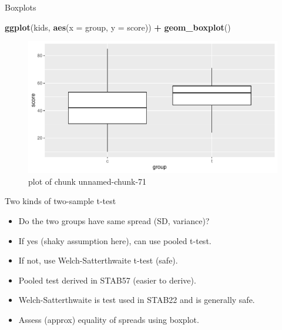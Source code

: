 \documentclass[ignorenonframetext,]{beamer}
\newenvironment{Shaded}{\begin{snugshade}}{\end{snugshade}}
\newcommand{\DataTypeTok}[1]{\textcolor[rgb]{0.13,0.29,0.53}{#1}}
\newcommand{\KeywordTok}[1]{\textcolor[rgb]{0.13,0.29,0.53}{\textbf{#1}}}
\newcommand{\NormalTok}[1]{#1}
\newcommand{\OperatorTok}[1]{\textcolor[rgb]{0.81,0.36,0.00}{\textbf{#1}}}
\newcommand{\StringTok}[1]{\textcolor[rgb]{0.31,0.60,0.02}{#1}}
\providecommand{\tightlist}{%
  \setlength{\itemsep}{0pt}\setlength{\parskip}{0pt}}
\begin{document}
\begin{frame}[fragile]{Boxplots}
\protect\hypertarget{boxplots}{}

\begin{Shaded}
\begin{Highlighting}[]
\KeywordTok{ggplot}\NormalTok{(kids, }\KeywordTok{aes}\NormalTok{(}\DataTypeTok{x =}\NormalTok{ group, }\DataTypeTok{y =}\NormalTok{ score)) }\OperatorTok{+}\StringTok{ }\KeywordTok{geom_boxplot}\NormalTok{()}
\end{Highlighting}
\end{Shaded}

\begin{figure}
\centering
\includegraphics{figure/unnamed-chunk-71-1.pdf}
\caption{plot of chunk unnamed-chunk-71}
\end{figure}

\end{frame}

\begin{frame}{Two kinds of two-sample t-test}
\protect\hypertarget{two-kinds-of-two-sample-t-test}{}

\begin{itemize}
\tightlist
\item
  Do the two groups have same spread (SD, variance)?
\item
  If yes (shaky assumption here), can use pooled t-test.
\item
  If not, use Welch-Satterthwaite t-test (safe).
\item
  Pooled test derived in STAB57 (easier to derive).
\item
  Welch-Satterthwaite is test used in STAB22 and is generally safe.
\item
  Assess (approx) equality of spreads using boxplot.
\end{itemize}

\end{frame}
\end{document}

